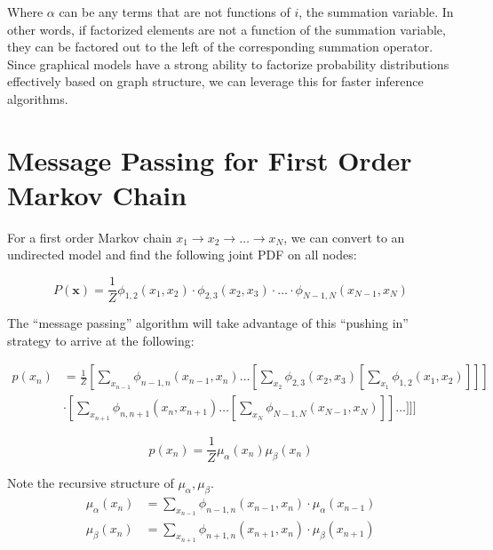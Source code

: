 \documentclass[a4paper,12pt]{report}
\begin{document}
Where $\alpha$ can be any terms that are not functions of $i$, the summation variable. In other words, if factorized elements are not a function of the summation variable, they can be factored out to the left of the corresponding summation operator. Since graphical models have a strong ability to factorize probability distributions effectively based on graph structure, we can leverage this for faster inference algorithms.

\section{Message Passing for First Order Markov Chain}

For a first order Markov chain $x_1 \to x_2 \to \dots \to x_N$, we can convert to an undirected model and find the following joint PDF on all nodes:

\begin{equation}
P(\pmb x) = \frac{1}{Z} \phi_{1,2}(x_1, x_2) \cdot \phi_{2,3}(x_2, x_3) \cdot \dots \cdot \phi_{N-1,N}(x_{N-1}, x_N)
\end{equation}

The ``message passing'' algorithm will take advantage of this ``pushing in'' strategy to arrive at the following:

\begin{equation}
\begin{split}
p(x_n) &= \frac{1}{Z} [\sum_{x_{n-1}}^{} \phi_{n-1, n} (x_{n-1}, x_n) \dots [ \sum_{x_2}^{} \phi_{2,3}(x_2, x_3) [\sum_{x_1}^{} \phi_{1,2}(x_1, x_2) ] ]  ] \\
& \cdot [\sum_{x_{n+1}}^{} \phi_{n, n+1}(x_n, x_{n+1}) \dots [\sum_{x_N}^{} \phi_{N-1, N}(x_{N-1}, x_N)] ]\dots] ] ]
\end{split}
\end{equation}

\begin{equation}
p(x_n) = \frac{1}{Z } \mu_\alpha(x_n) \mu_\beta(x_n)
\end{equation}

Note the recursive structure of $\mu_\alpha,\mu_\beta$.
\begin{equation}
\begin{split}
\mu_{\alpha}(x_n) &= \sum_{x_{n-1}}^{} \phi_{n-1, n}(x_{n-1}, x_n) \cdot \mu_\alpha(x_{n-1}) \\
\mu_{\beta}(x_n) &= \sum_{x_{n+1}}^{} \phi_{n+1, n} (x_{n+1}, x_n) \cdot \mu_{\beta}(x_{n+1}) \\
\end{split}
\end{equation}
\end{document}
